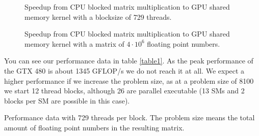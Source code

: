 \documentclass[DIV=12,oneside,a4paper]{scrartcl}
\begin{document}
\begin{figure}
    \begin{center}
        
    \end{center}
    \caption{Speedup from CPU blocked matrix multiplication to 
        GPU shared memory kernel with a blocksize of 729 threads.}
    \label{fig:sh_speedup}
\end{figure}

\begin{figure}
    \begin{center}
        
    \end{center}
    \caption{Speedup from CPU blocked matrix multiplication to 
        GPU shared memory kernel with a matrix of $4\cdot 10^{6}$
        floating point numbers.}
    \label{fig:thread_speedup}
\end{figure}

You can see our performance data in table \ref{table1}.
As the peak performance of the GTX 480 is about 1345 GFLOP/s
we do not reach it at all. We expect a higher performance
if we increase the problem size, as at a problem size of 8100
we start 12 thread blocks, although 26 are parallel executable
(13 SMs and 2 blocks per SM are possible in this case).

\begin{table}
    \begin{center}
    
    \end{center}
    \caption{Performance data with 729 threads per block.
        The problem size means the total amount of floating
        point numbers in the resulting matrix.}
    \label{table1}
\end{table}
\end{document}
